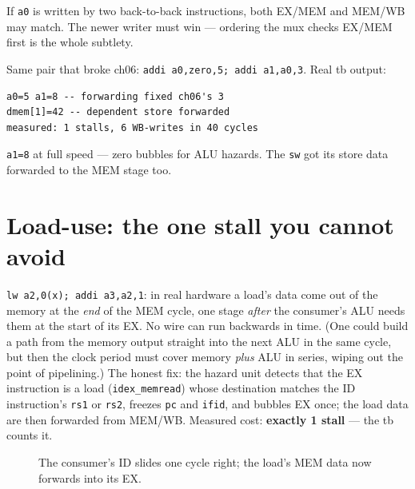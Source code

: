 \begin{checkpoint}\label{cp:newest07}
If \texttt{a0} is written by two back-to-back instructions, both
EX/MEM and MEM/WB may match. The newer writer must win --- ordering
the mux checks EX/MEM first is the whole subtlety.
\end{checkpoint}

\begin{example}\label{ex:fwdmeas07}
Same pair that broke ch06: \texttt{addi a0,zero,5; addi a1,a0,3}.
Real tb output:
\begin{lstlisting}
a0=5 a1=8 -- forwarding fixed ch06's 3
dmem[1]=42 -- dependent store forwarded
measured: 1 stalls, 6 WB-writes in 40 cycles
\end{lstlisting}
\texttt{a1=8} at full speed --- zero bubbles for ALU hazards. The
\texttt{sw} got its store data forwarded to the MEM stage too.
\end{example}

\section{Load-use: the one stall you cannot avoid}
\label{sec:loaduse07}

\begin{example}\label{ex:loaduse07}
\texttt{lw a2,0(x); addi a3,a2,1}: in real hardware a load's data
come out of the memory at the \emph{end} of the MEM cycle, one stage
\emph{after} the consumer's ALU needs them at the start of its EX. No
wire can run backwards in time. (One could build a path from the
memory output straight into the next ALU in the same cycle, but then
the clock period must cover memory \emph{plus} ALU in series, wiping
out the point of pipelining.) The honest fix: the hazard unit detects
that the EX instruction is a load (\texttt{idex\_memread}) whose
destination matches the ID instruction's \texttt{rs1} or \texttt{rs2},
freezes \texttt{pc} and \texttt{ifid}, and bubbles EX once; the load
data are then forwarded from MEM/WB. Measured cost: \textbf{exactly 1
stall} --- the tb counts it.
\end{example}

\begin{figure}[t]
\centering

\caption[Load-use timing]{The consumer's ID slides one cycle right;
the load's MEM data now forwards into its EX.}
\label{fig:loaduse07}
\end{figure}

